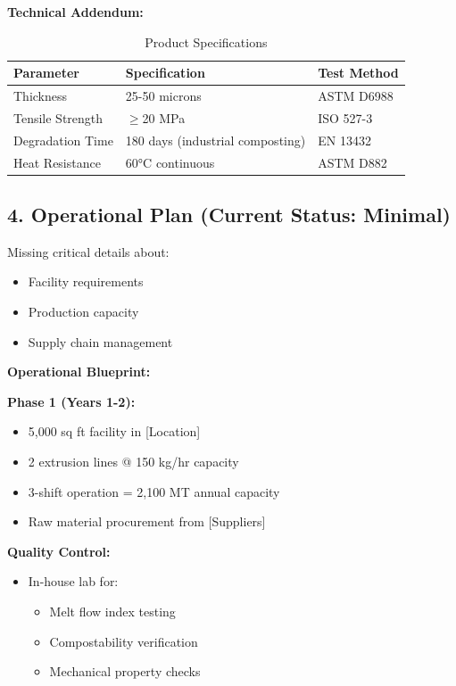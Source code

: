 \textbf{Technical Addendum:}

\begin{table}[h]
\centering
\caption{Product Specifications}
\begin{tabular}{|l|l|l|}
\hline
\textbf{Parameter} & \textbf{Specification} & \textbf{Test Method} \\ \hline
Thickness & 25-50 microns & ASTM D6988 \\ \hline
Tensile Strength & $\geq$20 MPa & ISO 527-3 \\ \hline
Degradation Time & 180 days (industrial composting) & EN 13432 \\ \hline
Heat Resistance & 60°C continuous & ASTM D882 \\ \hline
\end{tabular}
\end{table}

\subsection*{4. Operational Plan (Current Status: Minimal)}
Missing critical details about:
\begin{itemize}
\item Facility requirements
\item Production capacity
\item Supply chain management
\end{itemize}

\textbf{Operational Blueprint:}

\textbf{Phase 1 (Years 1-2):}
\begin{itemize}
\item 5,000 sq ft facility in [Location]
\item 2 extrusion lines @ 150 kg/hr capacity
\item 3-shift operation = 2,100 MT annual capacity
\item Raw material procurement from [Suppliers]
\end{itemize}

\textbf{Quality Control:}
\begin{itemize}
\item In-house lab for:
\begin{itemize}
\item Melt flow index testing
\item Compostability verification
\item Mechanical property checks
\end{itemize}
\end{itemize}


